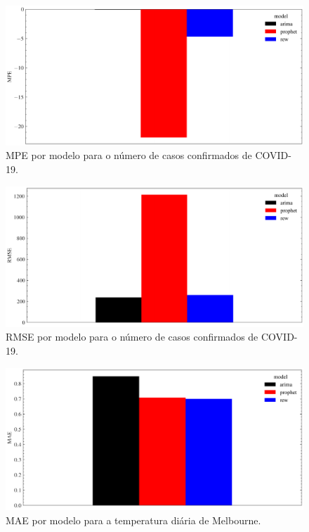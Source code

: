 \begin{figure}[!htp]
    \centering
    \includegraphics[width=5.0in]{img/covid_mpe_comparison.pdf}
    \caption{MPE por modelo para o número de casos confirmados de COVID-19.}
\end{figure}

\begin{figure}[!htp]
    \centering
    \includegraphics[width=5.0in]{img/covid_rmse_comparison.pdf}
    \caption{RMSE por modelo para o número de casos confirmados de COVID-19.}
\end{figure}

\begin{figure}[!htp]
    \centering
    \includegraphics[width=5.0in]{img/temperatures_mae_comparison.pdf}
    \caption{MAE por modelo para a temperatura diária de Melbourne.}
\end{figure}

